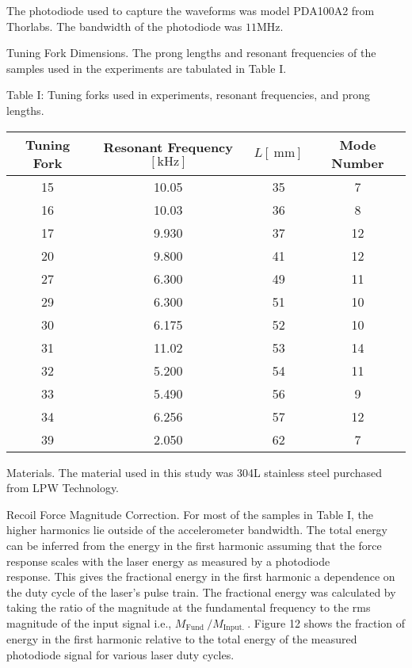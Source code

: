 \documentclass[10pt]{article}
\begin{document}
The photodiode used to capture the waveforms was model PDA100A2 from Thorlabs. The bandwidth of the photodiode was $11 \mathrm{MHz}$.

Tuning Fork Dimensions. The prong lengths and resonant frequencies of the samples used in the experiments are tabulated in Table I.

Table I: Tuning forks used in experiments, resonant frequencies, and prong lengths.

\begin{center}
\begin{tabular}{cccc}
\hline
Tuning Fork & Resonant Frequency $[\mathrm{kHz}]$ & $L[\mathrm{~mm}]$ & Mode Number \\
\hline
15 & 10.05 & 35 & 7 \\
16 & 10.03 & 36 & 8 \\
17 & 9.930 & 37 & 12 \\
20 & 9.800 & 41 & 12 \\
27 & 6.300 & 49 & 11 \\
29 & 6.300 & 51 & 10 \\
30 & 6.175 & 52 & 10 \\
31 & 11.02 & 53 & 14 \\
32 & 5.200 & 54 & 11 \\
33 & 5.490 & 56 & 9 \\
34 & 6.256 & 57 & 12 \\
39 & 2.050 & 62 & 7 \\
\end{tabular}
\end{center}

Materials. The material used in this study was 304L stainless steel purchased from LPW Technology.

Recoil Force Magnitude Correction. For most of the samples in Table I, the higher harmonics lie outside of the accelerometer bandwidth. The total energy can be inferred from the energy in the first harmonic assuming that the force response scales with the laser energy as measured by a photodiode\\
response. This gives the fractional energy in the first harmonic a dependence on the duty cycle of the laser's pulse train. The fractional energy was calculated by taking the ratio of the magnitude at the fundamental frequency to the rms magnitude of the input signal i.e., $M_{\text {Fund }} / M_{\text {Input. }}$. Figure 12 shows the fraction of energy in the first harmonic relative to the total energy of the measured photodiode signal for various laser duty cycles.
\end{document}
